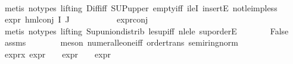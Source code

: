 \begin{isabellebody}
\ \ \ \ \ \ \isamarkupfalse%
\ {\isacharparenleft}{\kern0pt}metis\ {\isacharparenleft}{\kern0pt}no{\isacharunderscore}{\kern0pt}types{\isacharcomma}{\kern0pt}\ lifting{\isacharparenright}{\kern0pt}\ Diff{\isacharunderscore}{\kern0pt}iff\ SUP{\isacharunderscore}{\kern0pt}upper{}\ empty{\isacharunderscore}{\kern0pt}iff\ ileI{}\ insertE\ not{\isacharunderscore}{\kern0pt}le{\isacharunderscore}{\kern0pt}imp{\isacharunderscore}{\kern0pt}less{\isacharparenright}{\kern0pt}\isanewline
\ \ \ \ \isamarkupfalse%
\ {\isachardoublequoteopen}expr{\isacharunderscore}{\kern0pt}{}\ {\isacharparenleft}{\kern0pt}hml{\isacharunderscore}{\kern0pt}conj\ I\ J\ {\isasymPhi}{\isacharparenright}{\kern0pt}\ {\isasymge}\ {}{\isachardoublequoteclose}\isanewline
\ \ \ \ \ \ \isamarkupfalse%
\ expr{\isacharunderscore}{\kern0pt}{}{\isacharunderscore}{\kern0pt}conj\ \isanewline
\ \ \ \ \ \ \isamarkupfalse%
\ {\isacharparenleft}{\kern0pt}metis\ {\isacharparenleft}{\kern0pt}no{\isacharunderscore}{\kern0pt}types{\isacharcomma}{\kern0pt}\ lifting{\isacharparenright}{\kern0pt}\ Sup{\isacharunderscore}{\kern0pt}union{\isacharunderscore}{\kern0pt}distrib\ le{\isacharunderscore}{\kern0pt}sup{\isacharunderscore}{\kern0pt}iff\ nle{\isacharunderscore}{\kern0pt}le\ sup{\isachardot}{\kern0pt}orderE{\isacharparenright}{\kern0pt}\isanewline
\ \ \ \ \isamarkupfalse%
\ \isamarkupfalse%
\ False\ \isamarkupfalse%
\ assms{\isacharparenleft}{\kern0pt}{}{\isacharparenright}{\kern0pt}\isanewline
\ \ \ \ \ \ \isamarkupfalse%
\ {\isacharparenleft}{\kern0pt}meson\ numeral{\isacharunderscore}{\kern0pt}le{\isacharunderscore}{\kern0pt}one{\isacharunderscore}{\kern0pt}iff\ order{\isacharunderscore}{\kern0pt}trans\ semiring{\isacharunderscore}{\kern0pt}norm{\isacharparenleft}{\kern0pt}{}{}{\isacharparenright}{\kern0pt}{\isacharparenright}{\kern0pt}\isanewline
\ \ \isamarkupfalse%
\isanewline
\ \ \isamarkupfalse%
\ expr{\isacharunderscore}{\kern0pt}x{\isacharcolon}{\kern0pt}\ {\isachardoublequoteopen}expr{\isacharunderscore}{\kern0pt}{}\ {\isasympsi}\ {\isasymle}\ {}{\isachardoublequoteclose}\ {\isachardoublequoteopen}expr{\isacharunderscore}{\kern0pt}{}\ {\isasympsi}\ {\isasymle}\ {}{\isachardoublequoteclose}\ {\isachardoublequoteopen}expr{\isacharunderscore}{\kern0pt}{}\ {\isasympsi}\ {\isasymle}\ {}{\isachardoublequoteclose}\isanewline

\end{isabellebody}
